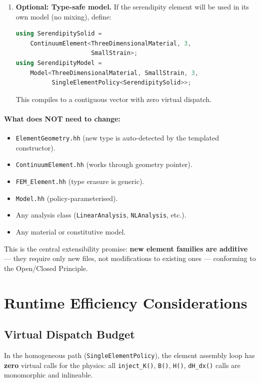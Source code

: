 \begin{enumerate}
  \item \textbf{Optional: Type-safe model.}
    If the serendipity element will be used in its own model (no mixing),
    define:
\begin{lstlisting}[language=C++]
using SerendipitySolid =
    ContinuumElement<ThreeDimensionalMaterial, 3,
                     SmallStrain>;
using SerendipityModel =
    Model<ThreeDimensionalMaterial, SmallStrain, 3,
          SingleElementPolicy<SerendipitySolid>>;
\end{lstlisting}
    This compiles to a contiguous vector with zero virtual dispatch.
\end{enumerate}

\paragraph{What does NOT need to change:}
\begin{itemize}[nosep]
  \item \texttt{ElementGeometry.hh} (new type is auto-detected by the
        templated constructor).
  \item \texttt{ContinuumElement.hh} (works through geometry pointer).
  \item \texttt{FEM\_Element.hh} (type erasure is generic).
  \item \texttt{Model.hh} (policy-parameterised).
  \item Any analysis class (\texttt{LinearAnalysis}, \texttt{NLAnalysis}, etc.).
  \item Any material or constitutive model.
\end{itemize}

This is the central extensibility promise: \textbf{new element families are
additive} --- they require only new files, not modifications to existing ones
--- conforming to the Open/Closed Principle.


\section{Runtime Efficiency Considerations}
\label{sec:efficiency}

\subsection{Virtual Dispatch Budget}

In the homogeneous path (\texttt{SingleElementPolicy}), the element assembly
loop has \textbf{zero} virtual calls for the physics: all
\texttt{inject\_K()}, \texttt{B()}, \texttt{H()}, \texttt{dH\_dx()} calls are
monomorphic and inlineable.

